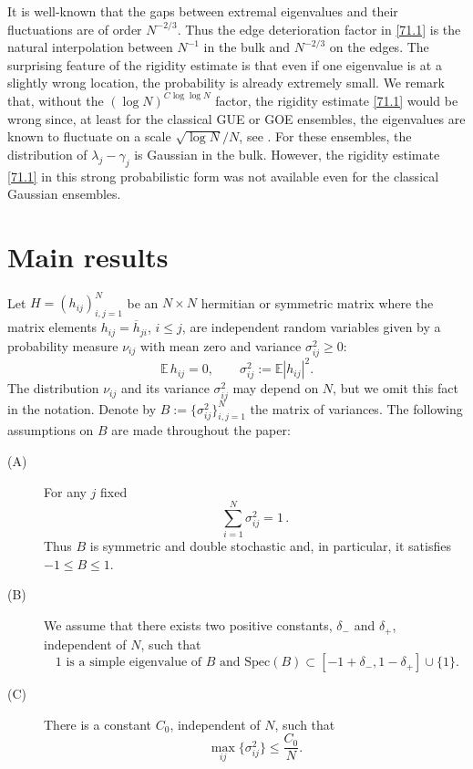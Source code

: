 \documentclass[draft]{article}
\newcommand{\be}{\begin{equation}}
\newcommand{\ee}{\end{equation}}
\newcommand{\ov}{\overline}
\newcommand{\E}{{\mathbb E }}
\numberwithin{equation}{section}
\numberwithin{theorem}{section}
\numberwithin{definition}{section}
\numberwithin{remark}{section}
\begin{document}
It is well-known that  the gaps between extremal eigenvalues  and their fluctuations 
 are of order $N^{-2/3}$. 
Thus the edge deterioration factor in \eqref{71.1} is the natural interpolation between $N^{-1}$ 
in the bulk and  $N^{-2/3}$ on the edges.   
The surprising feature 
of the rigidity estimate is that even if one eigenvalue is at a slightly 
 wrong location, the probability is already  extremely small.  
We remark that, without  the 
$(\log N)^{C\log \log N}$ factor, the rigidity estimate \eqref{71.1} would be wrong 
since, at  least for the classical   GUE or GOE ensembles,
 the eigenvalues are known to fluctuate on a scale $\sqrt{\log N}/N$, see \cite{GEG1, GEG2}.
For these ensembles,  the distribution of $\lambda_j - \gamma_j$ is Gaussian in the bulk.
However, 
the rigidity estimate  \eqref{71.1} in this strong probabilistic
form was not available even for the classical 
Gaussian ensembles.  








\section{Main results}



Let $H=(h_{ij})_{i,j=1}^N$  be an $N\times N$  hermitian or symmetric matrix  where the
 matrix elements $h_{ij}=\ov{h}_{ji}$, $ i \le j$, are independent 
random variables given by a probability measure $\nu_{ij}$ 
with mean zero and variance $\sigma_{ij}^2\ge 0$:
\be
  \E \, h_{ij} =0, \qquad \sigma_{ij}^2:= \E |h_{ij}|^2.
\label{aver}
\ee
The distribution $\nu_{ij}$ and its variance $\sigma_{ij}^2$ may depend on $N$,
 but we omit this fact in the notation. 
Denote by $B:=\{ \sigma^2_{ij}\}_{i,j=1}^N$ the matrix of variances. 
The following  assumptions on $B$ are made throughout the paper:
\begin{description}
\item[(A)] For any $j$ fixed
\be
   \sum_{i=1}^N \sigma^2_{ij} = 1 \, .
\label{sum}
\ee
Thus $B$ is symmetric and double stochastic and, in particular, it satisfies
$-1\leq B\leq 1$. 



\item[(B)]  We assume that there exists two positive constants, $\delta_-$ and
$\delta_+$, independent of $N$, such that
 \be\label{speccond}
\mbox{ 1 is a simple eigenvalue of $B$ and $\mbox{Spec}(B)
\subset [-1+\delta_-, 1-\delta_+]\cup\{1\}$.}
\ee


\item[(C)]   There is a constant $C_0$, independent of $N$, such that 
\be\label{1.3}
\max_{ij}\{\sigma_{ij}^2\}\leq \frac{C_0}{ N}.
\ee

\end{description} 
\end{document}
